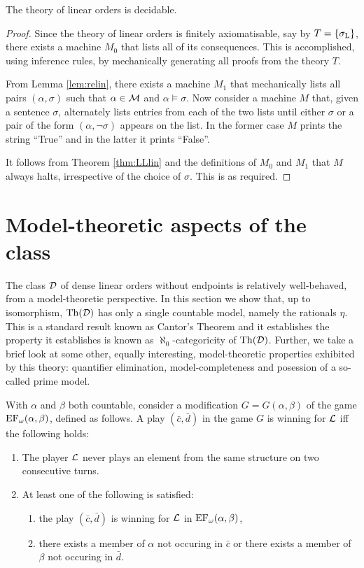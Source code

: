 \begin{thm} The theory of linear orders is decidable.
\end{thm}
\begin{proof} Since the theory of linear orders is finitely axiomatisable, say
	by $T=\left\lbrace \sigma_{\mathrm{L}}\right\rbrace$, there exists a machine $M_0$ that lists all of its
	consequences.  This is accomplished, using inference rules, by mechanically
	generating all proofs from the theory $T$.

	From Lemma \ref{lem:relin}, there exists a machine $M_1$ that mechanically
	lists all pairs $(\alpha,\sigma)$ such that $\alpha\in\mathcal{M}$ and
	$\alpha\models\sigma$.  Now consider a machine $M$ that, given a sentence
	$\sigma$, alternately lists entries from each of the two lists until either
	$\sigma$ or a pair of the form $(\alpha,\neg\sigma)$ appears on the list.  In
	the former case $M$ prints the string ``True'' and in the latter it prints
	``False''.

	It follows from Theorem \ref{thm:LLlin} and the definitions of $M_0$ and
	$M_1$ that $M$ always halts, irrespective of the choice of $\sigma$.  This is as
	required.
\end{proof}


\section{Model-theoretic aspects of the class \text{$\dense$}}

The class $\dense$ of dense linear orders without endpoints is relatively
well-behaved, from a model-theoretic perspective.  In this section we show that,
up to isomorphism, $\operatorname{Th}(\mathcal{D})$ has only a single countable model, namely the
rationals $\eta$.  This is a standard result known as Cantor's Theorem and it
establishes the property it establishes is known as $\aleph_0$-categoricity of
$\operatorname{Th}(\mathcal{D})$.  Further, we take a brief look at some other, equally
interesting, model-theoretic properties exhibited by this theory: quantifier
elimination, model-completeness and posession of a so-called prime model.

With $\alpha$ and $\beta$ both countable, consider a modification
$G=G(\alpha,\beta)$ of the game $\operatorname{EF}_{\omega}(\alpha,\beta)$, defined as
follows.  A play $(\bar{c},\bar{d})$ in the game $G$ is winning for $\mathcal{L}$ iff
the following holds:
\begin{enumerate}[noitemsep]
	\item The player $\mathcal{L}$ never plays an element from the same structure on
	      two consecutive turns.
	\item At least one of the following is satisfied:
	      \begin{enumerate}
		      \item the play $(\bar{c},\bar{d})$ is winning for $\mathcal{L}$ in
		            $\operatorname{EF}_\omega(\alpha,\beta)$,
		      \item there exists a member of $\alpha$ not occuring in $\bar{c}$
		            or there exists a member of $\beta$ not occuring in $\bar{d}$.
	      \end{enumerate}
\end{enumerate}

